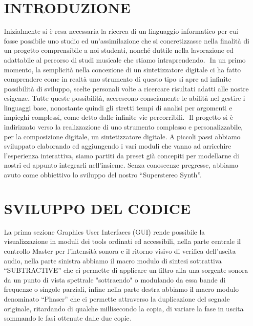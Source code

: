 \documentclass[
	a4paper,
	twocolumn
	]{article}
\begin{document}
\maketitle
\thispagestyle{empty}
\section*{INTRODUZIONE}
Inizialmente si è resa necessaria la ricerca di un linguaggio informatico per cui fosse possibile uno studio ed un’assimilazione che si concretizzasse nella finalità di un progetto comprensibile a noi studenti, nonché duttile nella lavorazione ed adattabile al percorso di studi musicale che stiamo intraprendendo.  In un primo momento, la semplicità nella concezione di un sintetizzatore digitale ci ha fatto comprendere come in realtà uno strumento di questo tipo si apre ad infinite possibilità di sviluppo, scelte personali volte a ricercare risultati adatti alle nostre esigenze. Tutte queste possibilità, accrescono consciamente le abilità nel gestire i linguaggi base, nonostante quindi gli stretti tempi di analisi per argomenti e impieghi complessi, come detto dalle infinite vie percorribili.  Il progetto si è indirizzato verso la realizzazione di uno strumento complesso e personalizzabile, per la composizione digitale, un sintetizzatore digitale. A piccoli passi abbiamo sviluppato elaborando ed aggiungendo i vari moduli che vanno ad arricchire l’esperienza interattiva, siamo partiti da preset già concepiti per modellarne di nostri ed appunto integrarli nell’insieme. Senza conoscenze pregresse, abbiamo avuto come obbiettivo lo sviluppo del nostro “Superstereo Synth”.
\section*{SVILUPPO DEL CODICE}
La prima sezione Graphics User Interfaces (GUI) rende possibile la visualizzazione in moduli dei tools ordinati ed accessibili, nella parte centrale il controllo Master per l’intensità sonora e il ritorno visivo di verifica dell’uscita audio, nella parte sinistra abbiamo il macro modulo di sintesi sottrattiva “SUBTRACTIVE”  che ci permette di applicare un filtro alla una sorgente sonora da un punto di vista spettrale "sottraendo" o modulando da essa bande di frequenze o singole parziali, infine nella parte destra abbiamo il macro modulo denominato “Phaser” che ci permette attraverso la duplicazione del segnale originale, ritardando di qualche millisecondo la copia, di variare la fase in uscita sommando le fasi ottenute dalle due copie.
\end{document}
